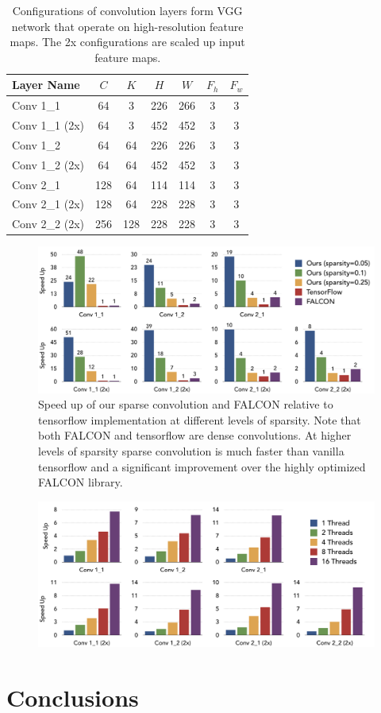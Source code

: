 \documentclass{article}
\begin{document}
\begin{table}[t]\centering
\small
\begin{tabularx}{0.75\textwidth}{Xcccccc}\toprule
    Layer Name & $C$ & $K$ & $H$ & $W$ & $F_h$ & $F_w$\\ \midrule 
    Conv 1\_1 & 64 & 3 & 226 & 266 & 3  & 3 \\
    Conv 1\_1 (2x) & 64 & 3 & 452 & 452 & 3  & 3 \\
    Conv 1\_2  & 64 & 64 & 226 & 226 & 3  & 3 \\
    Conv 1\_2 (2x) & 64 & 64 & 452 & 452 & 3  & 3 \\
    Conv 2\_1  & 128 & 64 & 114 & 114 & 3  & 3 \\
    Conv 2\_1 (2x) & 128 & 64 & 228 & 228 & 3  & 3 \\
    Conv 2\_2 (2x) & 256 & 128 & 228 & 228 & 3  & 3 \\
    \bottomrule
\end{tabularx}
    \vspace{1em}
    \caption{Configurations of convolution layers form VGG network that operate
    on high-resolution feature maps. The 2x configurations are scaled up input
    feature maps.}
\label{tab:conv_config}
\end{table}


\begin{figure}[t]
	\centering
	\includegraphics[width=\textwidth]{falcon_tf}
    \caption{Speed up of our sparse convolution and FALCON relative to
    tensorflow implementation at different levels of sparsity. Note that both
    FALCON and tensorflow are dense convolutions. At higher levels of sparsity
    sparse convolution is much faster than vanilla tensorflow and a significant
    improvement over the highly optimized FALCON library.}
\label{fig:falcon_tf}
\end{figure}

\begin{figure}
	\centering
	\includegraphics[width=\textwidth]{scaling}
    \label{fig:scaling}
\end{figure}
\label{sec:eval}

\section{Conclusions}
\label{sec:conclusion}


\nocite{*}
{}
\end{document}

